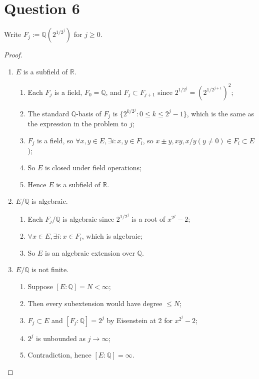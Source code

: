 \documentclass[12pt]{article}
\newcommand{\Q}{\mathbb{Q}}
\begin{document}
\newpage

\section*{Question 6}
Write $F_j:=\Q\left(2^{1/2^j}\right)$ for $j\ge 0$.
\begin{proof}
    ~\begin{enumerate}
\item $E$ is a subfield of $\mathbb{R}$.
\begin{enumerate}
\item Each $F_j$ is a field, $F_0=\Q$, and $F_j\subset F_{j+1}$ since $2^{1/2^j}=(2^{1/2^{j+1}})^2$;
\item The standard $\Q$-basis of $F_j$ is $\{2^{k/2^j}: 0\le k\le 2^j-1\}$, which is the same as the expression in the problem to $j$;
\item $F_j$ is a field, so $\forall x,y\in E,\exists i:x,y\in F_i$, so $x\pm y,xy,x/y(y\ne 0)\in F_i\subset E$);
\item So $E$ is closed under field operations;
\item Hence $E$ is a subfield of $\mathbb{R}$.
\end{enumerate}

\item $E/\Q$ is algebraic.
\begin{enumerate}
\item Each $F_j/\Q$ is algebraic since $2^{1/2^j}$ is a root of $x^{2^j}-2$;
\item $\forall x\in E,\exists i:x\in F_i$, which is algebraic;
\item So $E$ is an algebraic extension over $\Q$.
\end{enumerate}

\item $E/\Q$ is not finite.
\begin{enumerate}
\item Suppose $[E:\Q]=N<\infty$;
\item Then every subextension would have degree $\leq N$;
\item $F_j\subset E$ and $[F_j:\Q]=2^j$ by Eisenstein at 2 for $x^{2^j}-2$;
\item $2^j$ is unbounded as $j\to\infty$;
\item Contradiction, hence $[E:\Q]=\infty$.
\end{enumerate}
\end{enumerate}
\end{proof}
\end{document}
